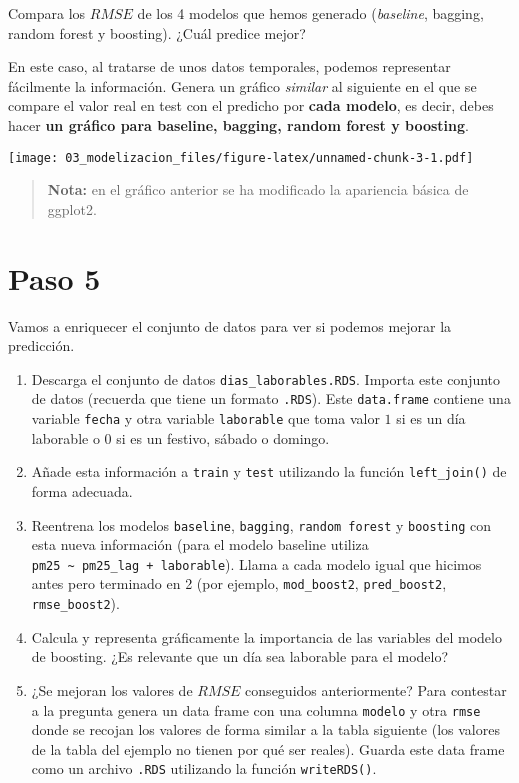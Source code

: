 \documentclass[
]{article}
\providecommand{\tightlist}{%
  \setlength{\itemsep}{0pt}\setlength{\parskip}{0pt}}
\begin{document}
Compara los \(RMSE\) de los 4 modelos que hemos generado
(\emph{baseline}, bagging, random forest y boosting). ¿Cuál predice
mejor?

En este caso, al tratarse de unos datos temporales, podemos representar
fácilmente la información. Genera un gráfico \emph{similar} al siguiente
en el que se compare el valor real en test con el predicho por
\textbf{cada modelo}, es decir, debes hacer \textbf{un gráfico para
baseline, bagging, random forest y boosting}.

\texttt{[image: 03\_modelizacion\_files/figure-latex/unnamed-chunk-3-1.pdf]}

\begin{quote}
\textbf{Nota:} en el gráfico anterior se ha modificado la apariencia
básica de ggplot2.
\end{quote}

\hypertarget{paso-5}{%
\section{Paso 5}\label{paso-5}}

Vamos a enriquecer el conjunto de datos para ver si podemos mejorar la
predicción.

\begin{enumerate}
\def\labelenumi{\arabic{enumi}.}
\tightlist
\item
  Descarga el conjunto de datos \texttt{dias\_laborables.RDS}. Importa
  este conjunto de datos (recuerda que tiene un formato \texttt{.RDS}).
  Este \texttt{data.frame} contiene una variable \texttt{fecha} y otra
  variable \texttt{laborable} que toma valor \(1\) si es un día
  laborable o \(0\) si es un festivo, sábado o domingo.
\item
  Añade esta información a \texttt{train} y \texttt{test} utilizando la
  función \texttt{left\_join()} de forma adecuada.
\item
  Reentrena los modelos \texttt{baseline}, \texttt{bagging},
  \texttt{random\ forest} y \texttt{boosting} con esta nueva información
  (para el modelo baseline utiliza
  \texttt{pm25\ \textasciitilde{}\ pm25\_lag\ +\ laborable}). Llama a
  cada modelo igual que hicimos antes pero terminado en 2 (por ejemplo,
  \texttt{mod\_boost2}, \texttt{pred\_boost2}, \texttt{rmse\_boost2}).
\item
  Calcula y representa gráficamente la importancia de las variables del
  modelo de boosting. ¿Es relevante que un día sea laborable para el
  modelo?
\item
  ¿Se mejoran los valores de \(RMSE\) conseguidos anteriormente? Para
  contestar a la pregunta genera un data frame con una columna
  \texttt{modelo} y otra \texttt{rmse} donde se recojan los valores de
  forma similar a la tabla siguiente (los valores de la tabla del
  ejemplo no tienen por qué ser reales). Guarda este data frame como un
  archivo \texttt{.RDS} utilizando la función \texttt{writeRDS()}.
\end{enumerate}
\end{document}
